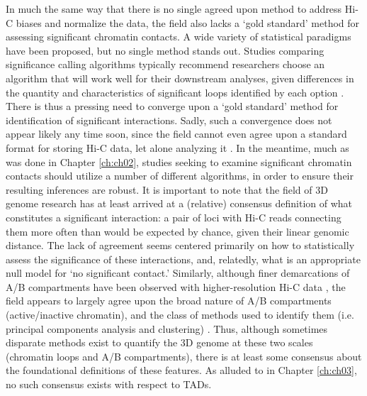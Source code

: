In much the same way that there is no single agreed upon method to address Hi-C biases and normalize the data, the field also lacks a `gold standard' method for assessing significant chromatin contacts. A wide variety of statistical paradigms have been proposed, but no single method stands out. Studies comparing significance calling algorithms typically recommend researchers choose an algorithm that will work well for their downstream analyses, given differences in the quantity and characteristics of significant loops identified by each option \cite{Forcato.2017, Ay.2015, Lyu.2020}. There is thus a pressing need to converge upon a `gold standard' method for identification of significant interactions. Sadly, such a convergence does not appear likely any time soon, since the field cannot even agree upon a standard format for storing Hi-C data, let alone analyzing it \cite{Pal.2019, Marti-Renom.2018}. In the meantime, much as was done in Chapter \ref{ch:ch02}, studies seeking to examine significant chromatin contacts should utilize a number of different algorithms, in order to ensure their resulting inferences are robust. It is important to note that the field of 3D genome research has at least arrived at a (relative) consensus definition of what constitutes a significant interaction: a pair of loci with Hi-C reads connecting them more often than would be expected by chance, given their linear genomic distance. The lack of agreement seems centered primarily on how to statistically assess the significance of these interactions, and, relatedly, what is an appropriate null model for `no significant contact.' Similarly, although finer demarcations of A/B compartments have been observed with higher-resolution Hi-C data \cite{Rao.2014}, the field appears to largely agree upon the broad nature of A/B compartments (active/inactive chromatin), and the class of methods used to identify them (i.e. principal components analysis and clustering) \cite{Miura.2018}. Thus, although sometimes disparate methods exist to quantify the 3D genome at these two scales (chromatin loops and A/B compartments), there is at least some consensus about the foundational definitions of these features. As alluded to in Chapter \ref{ch:ch03}, no such consensus exists with respect to TADs.


